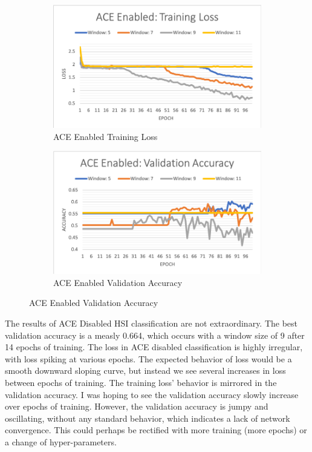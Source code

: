 \documentclass[12pt]{article}
\begin{document}
\begin{figure}[t]
	\begin{subfigure}{0.45\linewidth}
		\includegraphics[width=\linewidth]{ace-enabled-loss.png}
		\caption{ACE Enabled Training Loss}
	\end{subfigure}
	\hfill
	\begin{subfigure}{0.45\linewidth}
		\includegraphics[width=\linewidth]{ace-enabled-valacc.png}
		\caption{ACE Enabled Validation Accuracy}		
	\end{subfigure}
\end{figure}


The results of ACE Disabled HSI classification are not extraordinary.
%
The best validation accuracy is a measly 0.664, which occurs with a window size of 9 after 14 epochs of training.
%
The loss in ACE disabled classification is highly irregular, with loss spiking at various epochs.
%
The expected behavior of loss would be a smooth downward sloping curve, but instead we see several increases in loss between epochs of training.
%
The training loss' behavior is mirrored in the validation accuracy. 
%
I was hoping to see the validation accuracy slowly increase over epochs of training. 
%
However, the validation accuracy is jumpy and oscillating, without any standard behavior, which indicates a lack of network convergence.
%
This could perhaps be rectified with more training (more epochs) or a change of hyper-parameters.
\end{document}
